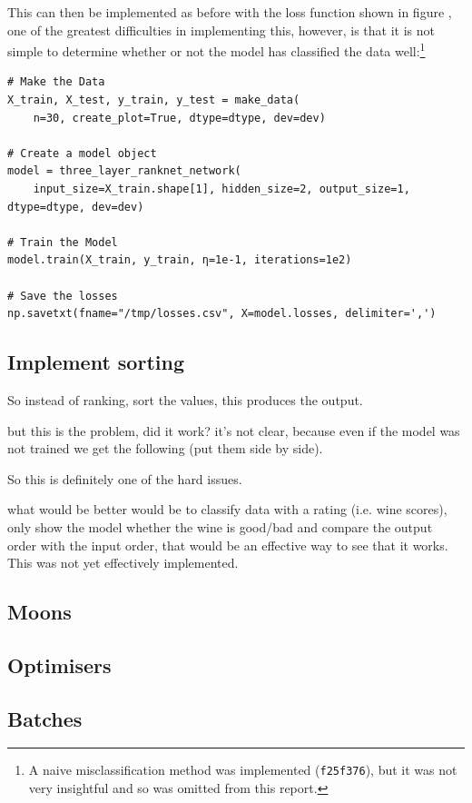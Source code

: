 \documentclass[a4paper,11pt,twoside]{article}
\begin{document}
This can then be implemented as before with the loss function shown
in figure , one of the greatest difficulties in
implementing this, however, is that it is not simple to determine
whether or not the model has classified the data well:\footnote{A naive misclassification method was implemented (\texttt{f25f376}),
but it was not very insightful and so was omitted from this report.} 

\begin{verbatim}
# Make the Data
X_train, X_test, y_train, y_test = make_data(
    n=30, create_plot=True, dtype=dtype, dev=dev)

# Create a model object
model = three_layer_ranknet_network(
    input_size=X_train.shape[1], hidden_size=2, output_size=1, dtype=dtype, dev=dev)

# Train the Model
model.train(X_train, y_train, η=1e-1, iterations=1e2)

# Save the losses
np.savetxt(fname="/tmp/losses.csv", X=model.losses, delimiter=',')

\end{verbatim}

\subsection{Implement sorting}
\label{sec:org34e0868}
So instead of ranking, sort the values, this produces the output.

but this is the problem, did it work? it's not clear, because even
if the model was not trained we get the following (put them side by side).

So this is definitely one of the hard issues.

what would be better would be to classify data with a rating
(i.e. wine scores), only show the model whether the wine is
good/bad and compare the output order with the input order, that
would be an effective way to see that it works. This was not yet
effectively implemented.
\subsection{Moons}
\label{sec:org64db56f}
\subsection{Optimisers}
\label{sec:org0362e30}
\subsection{Batches}
\label{sec:org21a7e61}
\end{document}
